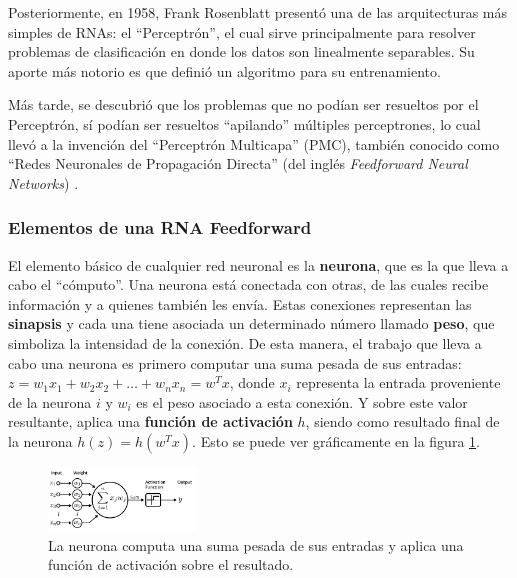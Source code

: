 \documentclass[../../main.tex]{subfiles}
\begin{document}
Posteriormente, en 1958, Frank Rosenblatt \cite{rosenblatt1958perceptron} presentó una de las arquitecturas más simples de RNAs: el ``Perceptrón'', el cual sirve principalmente para resolver problemas de clasificación en donde los datos son linealmente separables. Su aporte más notorio es que definió un algoritmo para su entrenamiento.

Más tarde, se descubrió que los problemas que no podían ser resueltos por el Perceptrón, sí podían ser resueltos ``apilando'' múltiples perceptrones, lo cual llevó a la invención del ``Perceptrón Multicapa'' (PMC), también conocido como ``Redes Neuronales de Propagación Directa'' (del inglés \textit{Feedforward Neural Networks}) \cite{deep-learning}. 

\subsubsection{Elementos de una RNA Feedforward}



El elemento básico de cualquier red neuronal es la \textbf{neurona}, que es la que lleva a cabo el ``cómputo''. Una neurona está conectada con otras, de las cuales recibe información y a quienes también les envía. Estas conexiones representan las \textbf{sinapsis} y cada una tiene asociada un determinado número llamado \textbf{peso}, que simboliza la intensidad de la conexión. De esta manera, el trabajo que lleva a cabo una neurona es primero computar una suma pesada de sus entradas: \(z = w_1x_1 + w_2x_2 + … + w_nx_n = w^T x\), donde \(x_i\) representa la entrada proveniente de la neurona \(i\) y \(w_i\) es el peso asociado a esta conexión. Y sobre este valor resultante, aplica una \textbf{función de activación} \(h\), siendo como resultado final de la neurona \(h(z) = h(w^T x)\). Esto se puede ver gráficamente en la figura \ref{fig:neuron}.

\begin{figure}[h!]
    \centering
    \includegraphics[width=0.35\textwidth]{figs/neuron.png}
    \caption{La neurona computa una suma pesada de sus entradas y aplica una función de activación sobre el resultado.}
    \label{fig:neuron}
\end{figure}
\end{document}
